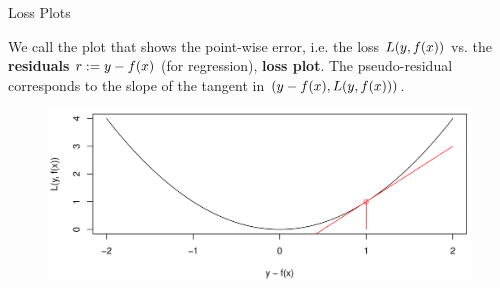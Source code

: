 \begin{vbframe}{Loss Plots}

We call the plot that shows the point-wise error, i.e. the loss $L(y, f(x))$ vs. the \textbf{residuals} $r := y - f(x)$ (for regression), \textbf{loss plot}. The pseudo-residual corresponds to the slope of the tangent in $\left(y - f(x), L(y, f(x)) \right)$. 

\vspace*{0.5cm}


\begin{figure}
\includegraphics[width = 1\linewidth]{figure_man/loss.png}
\end{figure}



\end{vbframe}



